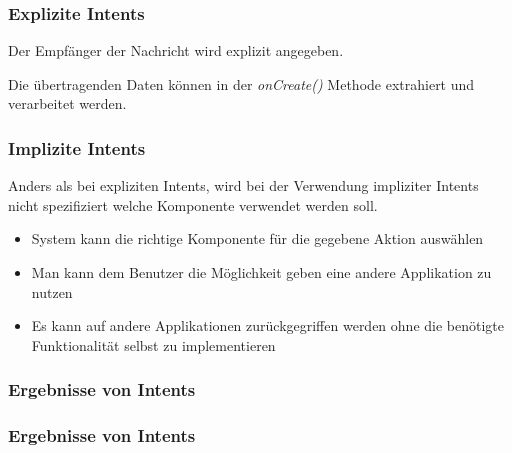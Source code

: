 \begin{frame}[label=explizit_intents]
   \frametitle{Explizite Intents}
   Der Empfänger der Nachricht wird explizit angegeben.

   
   
   Die übertragenden Daten können in der \emph{onCreate()} Methode extrahiert 
   und verarbeitet werden.

   
\end{frame}

\begin{frame}[label=implizit_intents]
   \frametitle{Implizite Intents}
   Anders als bei expliziten Intents, wird bei der Verwendung impliziter Intents 
   nicht spezifiziert welche Komponente verwendet werden soll.

   
   
   \begin{itemize}
      \item System kann die richtige Komponente für die gegebene Aktion auswählen
      \item Man kann dem Benutzer die Möglichkeit geben eine andere Applikation zu nutzen
      \item Es kann auf andere Applikationen zurückgegriffen werden ohne die
         benötigte Funktionalität selbst zu implementieren
   \end{itemize}
\end{frame}

\begin{frame}[label=intent_results]
   \frametitle{Ergebnisse von Intents}
   
   

   
\end{frame}

\begin{frame}[label=intent_results]
   \frametitle{Ergebnisse von Intents}
   
\end{frame}


